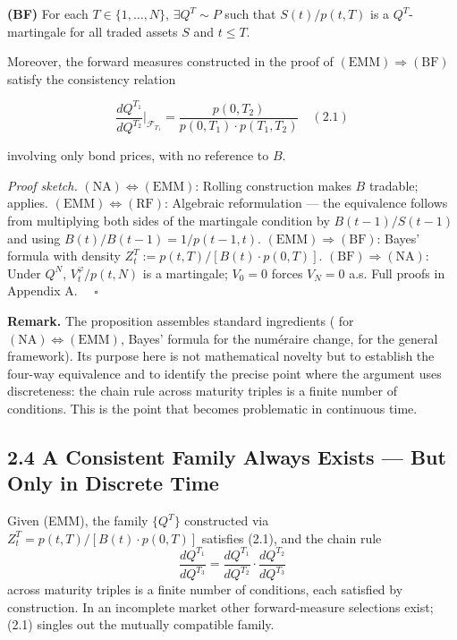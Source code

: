 \documentclass[
]{article}
\begin{document}
\textbf{(BF)} For each \(T \in \{1,\ldots,N\}\), \(\exists Q^T \sim P\)
such that \(S(t)/p(t,T)\) is a \(Q^T\)-martingale for all traded assets
\(S\) and \(t \le T\).

Moreover, the forward measures constructed in the proof of
\((\text{EMM}) \Rightarrow (\text{BF})\) satisfy the consistency
relation

\[\frac{dQ^{T_1}}{dQ^{T_2}}\bigg|_{\mathcal{F}_{T_1}} = \frac{p(0,T_2)}{p(0,T_1) \cdot p(T_1,T_2)}   \quad (2.1)\]

involving only bond prices, with no reference to \(B\).

\emph{Proof sketch.} \((\text{NA}) \iff (\text{EMM})\): Rolling
construction makes \(B\) tradable; \citet{HarrisonPliska1981} applies.
\((\text{EMM}) \iff (\text{RF})\): Algebraic reformulation --- the
equivalence follows from multiplying both sides of the martingale
condition by \(B(t-1)/S(t-1)\) and using \(B(t)/B(t-1) = 1/p(t-1,t)\).
\((\text{EMM}) \Rightarrow (\text{BF})\): Bayes' formula with density
\(Z^T_t := p(t,T)/[B(t) \cdot p(0,T)]\).
\((\text{BF}) \Rightarrow (\text{NA})\): Under \(Q^N\),
\(V^\varphi_t/p(t,N)\) is a martingale; \(V_0 = 0\) forces \(V_N = 0\)
a.s. Full proofs in Appendix A. \(\quad\square\)

\textbf{Remark.} The proposition assembles standard ingredients
(\citeauthor{HarrisonPliska1981} for \((\text{NA}) \iff (\text{EMM})\), Bayes' formula
for the numéraire change, \citealt{GemanElKarouiRochet1995} for the general
framework). Its purpose here is not mathematical novelty but to
establish the four-way equivalence and to identify the precise point
where the argument uses discreteness: the chain rule across maturity
triples is a finite number of conditions. This is the point that becomes
problematic in continuous time.

\subsection{2.4 A Consistent Family Always Exists --- But Only in
Discrete
Time}\label{a-consistent-family-always-exists-but-only-in-discrete-time}

Given (EMM), the family \(\{Q^T\}\) constructed via
\(Z^T_t = p(t,T)/[B(t) \cdot p(0,T)]\) satisfies (2.1), and the chain
rule
\[\frac{dQ^{T_1}}{dQ^{T_3}} = \frac{dQ^{T_1}}{dQ^{T_2}} \cdot \frac{dQ^{T_2}}{dQ^{T_3}}\]
across maturity triples is a finite number of conditions, each satisfied
by construction. In an incomplete market other forward-measure
selections exist; (2.1) singles out the mutually compatible family.
\end{document}
